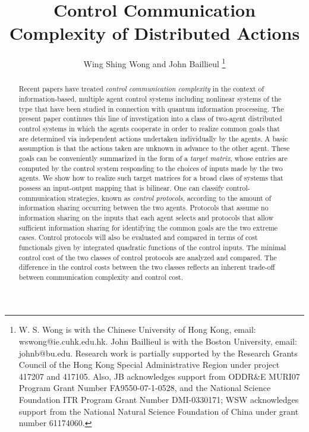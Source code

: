 \documentclass[12pt,onecolumn,draftcls]{IEEEtran}
\begin{document}
\title{Control Communication Complexity of Distributed Actions}
\author{Wing Shing Wong and John Baillieul
\thanks{W. S. Wong is with the Chinese University of Hong Kong, email: wswong@ie.cuhk.edu.hk.  John Baillieul is with the Boston University, email:
johnb@bu.edu.  Research work is partially supported by the Research Grants Council of the Hong Kong Special Administrative Region under project 417207 and 417105.  Also, JB acknowledges support from ODDR\&E MURI07 Program Grant Number FA9550-07-1-0528, and the National Science Foundation ITR Program Grant Number DMI-0330171; WSW acknowledges support from the National Natural Science Foundation of China under grant number 61174060.}}
\IEEEaftertitletext{\vspace{-2\baselineskip}} 
\maketitle

\begin{abstract}
Recent papers have treated {\em control communication complexity} in the context of information-based, multiple agent control systems including nonlinear systems of the type that have been studied  in connection with quantum information processing.  The present paper continues this line of investigation into a class of two-agent distributed control systems in which the agents cooperate in order to realize common goals that are determined via independent actions undertaken individually by the agents.  A
basic assumption is that the actions taken are unknown in advance to the other agent.
These goals can be conveniently summarized in the form of a {\em target matrix}, whose entries are computed by the control system responding to the choices of inputs made by the two agents.  We show how to realize such target matrices for a broad class of systems that possess an input-output mapping that is bilinear.   One can classify control-communication strategies, known as {\em control protocols}, according to the amount of information sharing occurring between the two agents.  Protocols that assume no information sharing on the inputs that each agent selects and protocols that allow sufficient information sharing for identifying the common goals  are the two extreme cases.  Control protocols will also be evaluated and compared in terms of cost functionals given by integrated quadratic functions of the control inputs.  The minimal control cost of the two classes of control protocols are analyzed and compared.  The difference in the control costs between the two classes  reflects an inherent trade-off between communication complexity and control cost.
\end{abstract}
\end{document}
